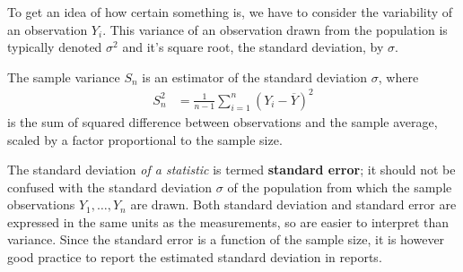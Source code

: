 \documentclass[
  11pt,
  letterpaper,
]{scrbook}
\theoremstyle{definition}
\theoremstyle{remark}
\begin{document}
To get an idea of how certain something is, we have to consider the
variability of an observation \(Y_i\). This variance of an observation
drawn from the population is typically denoted \(\sigma^2\) and it's
square root, the standard deviation, by \(\sigma\).

The sample variance \(S_n\) is an estimator of the standard deviation
\(\sigma\), where \begin{align*}
S^2_n &= \frac{1}{n-1} \sum_{i=1}^n (Y_i-\overline{Y})^2
\end{align*} is the sum of squared difference between observations and
the sample average, scaled by a factor proportional to the sample size.

The standard deviation \emph{of a statistic} is termed \textbf{standard
error}; it should not be confused with the standard deviation \(\sigma\)
of the population from which the sample observations
\(Y_1, \ldots, Y_n\) are drawn. Both standard deviation and standard
error are expressed in the same units as the measurements, so are easier
to interpret than variance. Since the standard error is a function of
the sample size, it is however good practice to report the estimated
standard deviation in reports.
\end{document}
